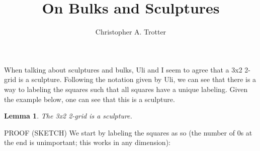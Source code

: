 \documentclass[a4paper,11pt]{article}
\newtheorem{lemma}[theorem]{Lemma}
\begin{document}
\title{On Bulks and Sculptures}

\author{Christopher A. Trotter}

\maketitle

When talking about sculptures and bulks, Uli and I seem to agree that a 3x2 2-grid is a sculpture. Following the notation given by Uli, we can see that there is a way to labeling the squares such that all squares have a unique labeling. Given the example below, one can see that this is a sculpture.

\begin{lemma}
    The 3x2 2-grid is a sculpture.
\end{lemma}

\noindent PROOF (SKETCH) We start by labeling the squares as so (the number of 0s
at the end is unimportant; this works in any dimension):
\end{document}
